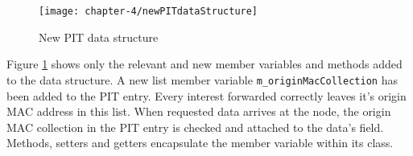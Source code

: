 \vspace{5mm} %

\begin{figure}[H]
  \centering
  \texttt{[image: chapter-4/newPITdataStructure]}
  \caption{New PIT data structure}
  \label{fig:newPITdataStructure}
\end{figure}

\vspace{5mm} %

Figure \ref{fig:newPITdataStructure} shows only the relevant and new member variables and methods added to the data structure. A new list member variable \texttt{m\_originMacCollection} has been added to the PIT entry. Every interest forwarded correctly leaves it's origin MAC address in this list. When requested data arrives at the node, the origin MAC collection in the PIT entry is checked and attached to the data's field. Methods, setters and getters encapsulate the member variable within its class.





